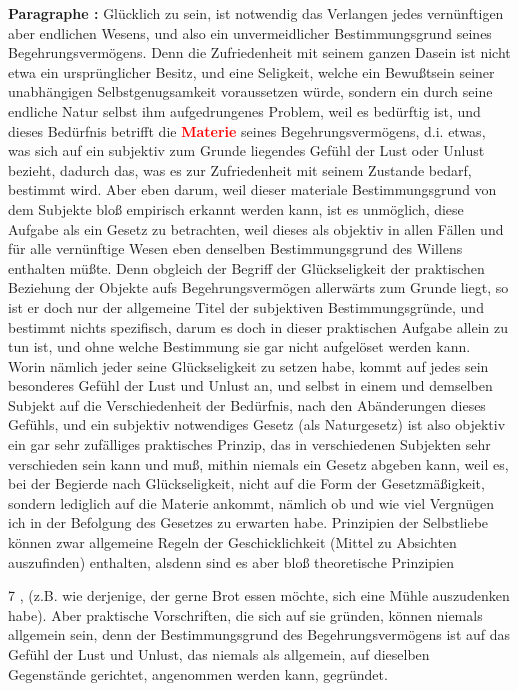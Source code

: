 \documentclass[a4paper,12pt,twoside]{book}
\newcommand{\match}[1]{\textcolor{red}{\textbf{#1}}}
\begin{document}
	\noindent\textbf{Paragraphe : }Glücklich zu sein, ist notwendig das Verlangen jedes vernünftigen aber endlichen Wesens, und also ein unvermeidlicher Bestimmungsgrund seines Begehrungsvermögens. Denn die Zufriedenheit mit seinem ganzen Dasein ist nicht etwa ein ursprünglicher Besitz, und eine Seligkeit, welche ein Bewußtsein seiner unabhängigen Selbstgenugsamkeit voraussetzen würde, sondern ein durch seine endliche Natur selbst ihm aufgedrungenes Problem, weil es bedürftig ist, und dieses Bedürfnis betrifft die \match{Materie} seines Begehrungsvermögens, d.i. etwas, was sich auf ein subjektiv zum Grunde liegendes Gefühl der Lust oder Unlust bezieht, dadurch das, was es zur Zufriedenheit mit seinem Zustande bedarf, bestimmt wird. Aber eben darum, weil dieser materiale Bestimmungsgrund von dem Subjekte bloß empirisch erkannt werden kann, ist es unmöglich, diese Aufgabe als ein Gesetz zu betrachten, weil dieses als objektiv in allen Fällen und für alle vernünftige Wesen eben denselben Bestimmungsgrund des Willens enthalten müßte. Denn obgleich der Begriff der Glückseligkeit der praktischen Beziehung der Objekte aufs Begehrungsvermögen allerwärts zum Grunde liegt, so ist er doch nur der allgemeine Titel der subjektiven Bestimmungsgründe, und bestimmt nichts spezifisch, darum es doch in dieser praktischen Aufgabe allein zu tun ist, und ohne welche Bestimmung sie gar nicht aufgelöset werden kann. Worin nämlich jeder seine Glückseligkeit zu setzen habe, kommt auf jedes sein besonderes Gefühl der Lust und Unlust an, und selbst in einem und demselben Subjekt auf die Verschiedenheit der Bedürfnis, nach den Abänderungen dieses Gefühls, und ein subjektiv notwendiges Gesetz (als Naturgesetz) ist also objektiv ein gar sehr zufälliges praktisches Prinzip, das in verschiedenen Subjekten sehr verschieden sein kann und  muß, mithin niemals ein Gesetz abgeben kann, weil es, bei der Begierde nach Glückseligkeit, nicht auf die Form der Gesetzmäßigkeit, sondern lediglich auf die Materie ankommt, nämlich ob und wie viel Vergnügen ich in der Befolgung des Gesetzes zu erwarten habe. Prinzipien der Selbstliebe können zwar allgemeine Regeln der Geschicklichkeit (Mittel zu Absichten auszufinden) enthalten, alsdenn sind es aber bloß theoretische Prinzipien
	
	
	7
	, (z.B. wie derjenige, der gerne Brot essen möchte, sich eine Mühle auszudenken habe). Aber praktische Vorschriften, die sich auf sie gründen, können niemals allgemein sein, denn der Bestimmungsgrund des Begehrungsvermögens ist auf das Gefühl der Lust und Unlust, das niemals als allgemein, auf dieselben Gegenstände gerichtet, angenommen werden kann, gegründet. 
	
\end{document}
